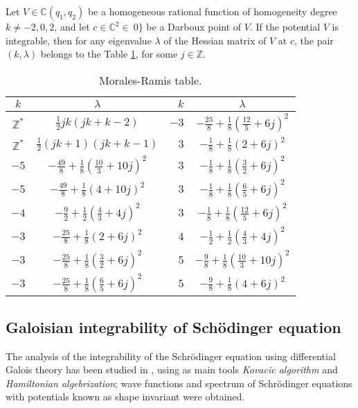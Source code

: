 \documentclass[final]{siamart0516}
\begin{document}
\begin{theorem}  Let $V \in \mathbb{C}(q_1,q_2)$ be a homogeneous rational function of homogeneity degree $k\ne -2,0,2$, and let $c \in \mathbb{C}^2\in\ 0\}$  be a Darboux point of $V$. If the potential $V$ is integrable, then for any eigenvalue $\lambda$ of the Hessian matrix of $V$ at $c$, the pair $(k, \lambda )$ belongs to the Table \ref{table:MR}, 
for some $j \in \mathbb{Z}$. 
\begin{table}[ht]
\centering 
\begin{tabular}{|c|c||r|c |} 
\hline
$k$ & $\lambda$ & $k$ & $\lambda$ \\
\hline
$\mathbb{Z}^*$ & $\frac{1}{2}jk (jk + k -2)$ & $-3$ &  $-\frac{25}{8} + \frac{1}{8} (\frac{12}{5}+ 6j)^2$\\
\hline 
%
$\mathbb{Z}^*$ & $\frac{1}{2}(jk+1) (jk + k -1)$ & $3$ &  $-\frac{1}{8} + \frac{1}{8} (2+ 6j)^2$\\
\hline
%
$-5$ & $-\frac{49}{8} + \frac{1}{8}(\frac{10}{3} + 10j)^2$ & $3$ &  $-\frac{1}{8} + \frac{1}{8} (\frac{3}{2}+ 6j)^2$\\
\hline
$-5$ & $-\frac{49}{8} + \frac{1}{8}(4 + 10j)^2$ & $3$ &  $-\frac{1}{8} + \frac{1}{8} (\frac{6}{5}+ 6j)^2$\\
\hline
$-4$ & $-\frac{9}{2} + \frac{1}{2}(\frac{4}{3} + 4j)^2$ & $3$ &  $-\frac{1}{8} + \frac{1}{8} (\frac{12}{5}+ 6j)^2$\\
\hline
$-3$ & $-\frac{25}{8} + \frac{1}{8}(2 + 6j)^2$ & $4$ &  $-\frac{1}{2} + \frac{1}{2} (\frac{4}{3}+ 4j)^2$\\
\hline
$-3$ & $-\frac{25}{8} + \frac{1}{8}(\frac{3}{2} + 6j)^2$ & $5$ &  $-\frac{9}{8} + \frac{1}{8} (\frac{10}{3}+ 10j)^2$\\
\hline
$-3$ & $-\frac{25}{8} + \frac{1}{8}(\frac{6}{5} + 6j)^2$ & $5$ &  $-\frac{9}{8} + \frac{1}{8} (4+ 6j)^2$\\
\hline
\end{tabular}
\caption{Morales-Ramis table.} 
\label{table:MR} \end{table}
\end{theorem}


\subsection{Galoisian integrability of Sch\"odinger equation}\label{sec:sch}
The analysis of the  integrability of the Schr\"odinger equation using differential Galois theory has been studied in \cite{acbook,acmowe}, using as main tools \emph{Kovacic algorithm} and \emph{Hamiltonian algebrization}; wave functions and spectrum of Schr\"odinger equations with potentials known as shape invariant were obtained.
\end{document}
